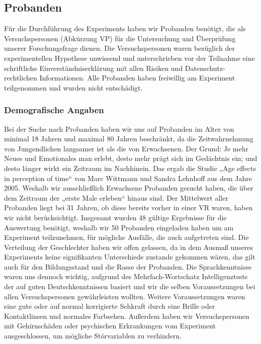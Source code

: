 \documentclass{Bericht}
\begin{document}
	\subsection{Probanden}
	Für die Durchführung des Experiments haben wir Probanden benötigt, die als Versuchspersonen
(Abkürzung VP) für die Untersuchung und Überprüfung unserer Forschungsfrage dienen.
Die Versuchspersonen waren bezüglich der experimentellen Hypothese unwissend und unterschrieben
vor der Teilnahme eine schriftliche Einverständniserklärung mit allen Risiken und Datenschutz-
rechtlichen Informationen. Alle Probanden haben freiwillig am Experiment teilgenommen
und wurden nicht entschädigt.
\subsubsection{Demografische Angaben}
Bei der Suche nach Probanden haben wir uns auf Probanden im Alter von minimal 18 Jahren
und maximal 80 Jahren beschränkt, da die Zeitwahrnehmung von Jungendlichen langsamer ist
als die von Erwachsenen. Der Grund: Je mehr Neues und Emotionales man erlebt, desto mehr
prägt sich im Gedächtnis ein; und desto länger wirkt ein Zeitraum im Nachhinein. Das ergab
die Studie „Age effects in perception of time“ von Marc Wittmann und Sandra Lehnhoff aus
dem Jahre 2005. Weshalb wir ausschließlich Erwachsene Probanden gesucht haben, die über
dem Zeitraum der „erste Male erleben“ hinaus sind. Der Mittelwert aller Probanden liegt bei 31
Jahren, ob diese bereits vorher in einer VR waren, haben wir nicht berücksichtigt.
Insgesamt wurden 48 gültige Ergebnisse für die Auswertung benötigt, weshalb wir 50 Probanden
eingeladen haben um am Experiment teilzunehmen, für mögliche Ausfälle, die auch aufgetreten
sind.
Die Verteilung der Geschlechter haben wir offen gelassen, da in dem Ausmaß unseres Experiments
keine signifikanten Unterschiede zustande gekommen wären, das gilt auch für den Bildungsstand
und die Rasse der Probanden. Die Sprachkenntnisse waren uns dennoch wichtig,
aufgrund des Mehrfach-Wortschatz Intelligenztests der auf guten Deutschkenntnissen basiert
und wir die selben Voraussetzungen bei allen Versuchspersonen gewährleisten wollten. Weitere
Voraussetzungen waren eine gute oder auf normal korrigierte Sehkraft durch eine Brille oder
Kontaktlinsen und normales Farbsehen. Außerdem haben wir Versuchspersonen mit Gehirnschäden
oder psychischen Erkrankungen vom Experiment ausgeschlossen, um mögliche Störvariablen
zu verhindern.
\end{document}
